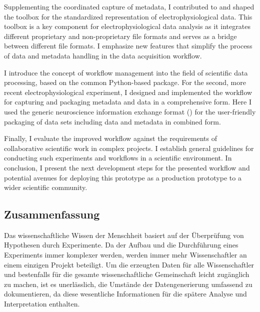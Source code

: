 \begin{minipage}[t][0pt]{\linewidth}
Supplementing the coordinated capture of metadata, I contributed to and shaped the  toolbox for the standardized representation of electrophysiological data. This toolbox is a key component for electrophysiological data analysis as it integrates different proprietary and non-proprietary file formats and serves as a bridge between different file formats. I emphasize new features that simplify the process of data and metadata handling in the data acquisition workflow.

I introduce the concept of workflow management into the field of scientific data processing, based on the common Python-based  package. For the second, more recent electrophysiological experiment, I designed and implemented the workflow for capturing and packaging metadata and data in a comprehensive form. Here I used the generic neuroscience information exchange format () for the user-friendly packaging of data sets including data and metadata in combined form.

Finally, I evaluate the improved workflow against the requirements of collaborative scientific work in complex projects. I establish general guidelines for conducting such experiments and workflows in a scientific environment. In conclusion, I present the next development steps for the presented workflow and potential avenues for deploying this prototype as a production prototype to a wider scientific community.
\end{minipage}

\cleardoublepage
\thispagestyle{empty}
\subsection*{Zusammenfassung}

Das wissenschaftliche Wissen der Menschheit basiert auf der Überprüfung von Hypothesen durch Experimente.
Da der Aufbau und die Durchführung eines Experiments immer komplexer werden, werden immer mehr Wissenschaftler an einem einzigen Projekt beteiligt. Um die erzeugten Daten für alle Wissenschaftler und bestenfalls für die gesamte wissenschaftliche Gemeinschaft leicht zugänglich zu machen, ist es unerlässlich, die Umstände der Datengenerierung umfassend zu dokumentieren, da diese wesentliche Informationen für die spätere Analyse und Interpretation enthalten.

